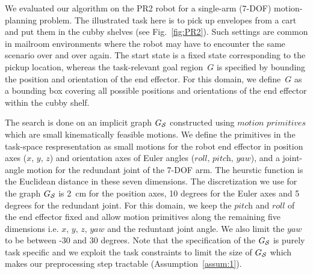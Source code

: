 \documentclass[a4paper,10pt]{article}
\begin{document}
We evaluated our algorithm on the PR2 robot for a single-arm (7-DOF) motion-planning problem. The illustrated task here is to pick up envelopes from a cart and put them in the cubby shelves (see Fig.~\ref{fig:PR2}). Such settings are common in mailroom environments where the robot may have to encounter the same scenario over and over again. The start state is a fixed state corresponding to the pickup location, whereas the task-relevant goal region~$G$ is specified by bounding the position and orientation of the end effector. For this domain, we define~$G$ as a bounding box covering all possible positions and orientations of the end effector within the cubby shelf.

The search is done on an implicit graph $G_\mathcal{S}$ constructed using $\textit{motion primitives}$ which are small kinematically feasible motions. We define the primitives in the task-space respresentation as small motions for the robot end effector in position axes ($\textit{x, y, z}$) and orientation axes of Euler angles ($\textit{roll, pitch, yaw}$), and a joint-angle motion for the redundant joint of the 7-DOF arm. 
The heurstic function is the Euclidean distance in these seven dimensions. The discretization we use for the graph $G_\mathcal{S}$ is 2~cm for the position axes, 10 degrees for the Euler axes and 5 degrees for the redundant joint. 
For this domain, we keep the $\textit{pitch}$ and $\textit{roll}$ of the end effector fixed and allow motion primitives along the remaining five dimensions i.e. $\textit{x, y, z, yaw}$ and the reduntant joint angle. We also limit the $\textit{yaw}$ to be between -30 and 30 degrees. Note that the specification of the $G_\mathcal{S}$ is purely task specific and we exploit the task constraints to limit the size of $G_\mathcal{S}$ which makes our preprocessing step tractable (Assumption~\ref{assum:1}).
\end{document}
